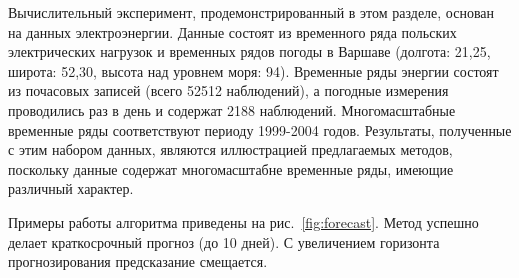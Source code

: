 \documentclass[12pt,fleqn,unicode]{article}
\begin{document}
Вычислительный эксперимент, продемонстрированный в этом разделе, основан на данных электроэнергии. Данные состоят из временного ряда польских электрических нагрузок и временных рядов погоды в Варшаве (долгота: 21,25, широта: 52,30, высота над уровнем моря: 94). Временные ряды энергии состоят из почасовых записей (всего 52512 наблюдений), а погодные измерения проводились раз в день и содержат 2188 наблюдений. Многомасштабные временные ряды соответствуют периоду 1999-2004 годов. Результаты, полученные с этим набором данных, являются иллюстрацией предлагаемых методов, поскольку данные содержат многомасштабне временные ряды, имеющие различный характер.

Примеры работы алгоритма приведены на рис.~\ref{fig:forecast}. Метод успешно делает краткосрочный прогноз (до 10 дней). С увеличением горизонта прогнозирования предсказание смещается. 
\end{document}
